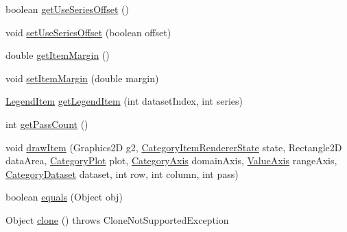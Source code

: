 \begin{DoxyCompactItemize}
\item 
boolean \mbox{\hyperlink{classorg_1_1jfree_1_1chart_1_1renderer_1_1category_1_1_line_and_shape_renderer_a5966e51f1ff8a604e9ec08c9700ed5ad}{get\+Use\+Series\+Offset}} ()
\item 
void \mbox{\hyperlink{classorg_1_1jfree_1_1chart_1_1renderer_1_1category_1_1_line_and_shape_renderer_a49afbe55f7c35398895d604c2727c6f3}{set\+Use\+Series\+Offset}} (boolean offset)
\item 
double \mbox{\hyperlink{classorg_1_1jfree_1_1chart_1_1renderer_1_1category_1_1_line_and_shape_renderer_af16e29caa6c86f32b5bb286b2ddefa3f}{get\+Item\+Margin}} ()
\item 
void \mbox{\hyperlink{classorg_1_1jfree_1_1chart_1_1renderer_1_1category_1_1_line_and_shape_renderer_ae4b9ba27e8ceaab0ba92c76e04d77d95}{set\+Item\+Margin}} (double margin)
\item 
\mbox{\hyperlink{classorg_1_1jfree_1_1chart_1_1_legend_item}{Legend\+Item}} \mbox{\hyperlink{classorg_1_1jfree_1_1chart_1_1renderer_1_1category_1_1_line_and_shape_renderer_ac095c9d61c12633c01dceb69131d655e}{get\+Legend\+Item}} (int dataset\+Index, int series)
\item 
int \mbox{\hyperlink{classorg_1_1jfree_1_1chart_1_1renderer_1_1category_1_1_line_and_shape_renderer_a1bce5bacad7ef3f3582ae42f0d79b5cb}{get\+Pass\+Count}} ()
\item 
void \mbox{\hyperlink{classorg_1_1jfree_1_1chart_1_1renderer_1_1category_1_1_line_and_shape_renderer_a9e8ead8e79beb886b4a1be1d3a58ed22}{draw\+Item}} (Graphics2D g2, \mbox{\hyperlink{classorg_1_1jfree_1_1chart_1_1renderer_1_1category_1_1_category_item_renderer_state}{Category\+Item\+Renderer\+State}} state, Rectangle2D data\+Area, \mbox{\hyperlink{classorg_1_1jfree_1_1chart_1_1plot_1_1_category_plot}{Category\+Plot}} plot, \mbox{\hyperlink{classorg_1_1jfree_1_1chart_1_1axis_1_1_category_axis}{Category\+Axis}} domain\+Axis, \mbox{\hyperlink{classorg_1_1jfree_1_1chart_1_1axis_1_1_value_axis}{Value\+Axis}} range\+Axis, \mbox{\hyperlink{interfaceorg_1_1jfree_1_1data_1_1category_1_1_category_dataset}{Category\+Dataset}} dataset, int row, int column, int pass)
\item 
boolean \mbox{\hyperlink{classorg_1_1jfree_1_1chart_1_1renderer_1_1category_1_1_line_and_shape_renderer_ad05167c0c829aea1510479b08a99b6ad}{equals}} (Object obj)
\item 
Object \mbox{\hyperlink{classorg_1_1jfree_1_1chart_1_1renderer_1_1category_1_1_line_and_shape_renderer_a19e4cfbd902580d20d14b6df22cdb21a}{clone}} ()  throws Clone\+Not\+Supported\+Exception 
\end{DoxyCompactItemize}
